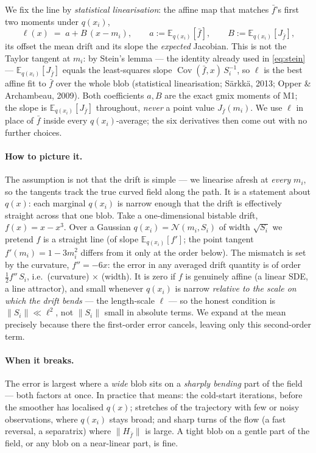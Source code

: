 \documentclass[11pt]{article}
\newcommand{\E}{\mathbb{E}}
\newcommand{\Eqx}{\E_{q(x_i)}}
\newcommand{\Cov}{\operatorname{Cov}}
\begin{document}
\noindent
We fix the line by \emph{statistical linearisation}: the affine map that
matches $\bar f$'s first two moments under $q(x_i)$,
\begin{equation}
\ell(x) \;=\; a + B\,(x-m_i),
\qquad
a := \Eqx[\bar f],
\qquad
B := \Eqx[J_{\bar f}],
\label{eq:linearise}
\end{equation}
its offset the mean drift and its slope the \emph{expected} Jacobian. This
is not the Taylor tangent at $m_i$: by Stein's lemma --- the identity
already used in \eqref{eq:stein} --- $\Eqx[J_{\bar f}]$ equals the
least-squares slope $\Cov(\bar f,x)\,S_i^{-1}$, so $\ell$ is the best
affine fit to $\bar f$ over the whole blob (statistical linearisation; S\"arkk\"a, 2013; Opper \& Archambeau, 2009). Both coefficients $a,B$ are
the exact gmix moments of M1; the slope is $\Eqx[J_{\bar f}]$
throughout, \emph{never} a point value $J_{\bar f}(m_i)$. We use $\ell$ in
place of $\bar f$ inside every $q(x_i)$-average; the six derivatives then
come out with no further choices.

\paragraph{How to picture it.}
The assumption is not that the drift is simple --- we linearise afresh at
\emph{every} $m_i$, so the tangents track the true curved field along the
path. It is a statement about $q(x)$: each marginal $q(x_i)$ is narrow
enough that the drift is effectively straight across that one blob. Take a
one-dimensional bistable drift, $f(x)=x-x^3$. Over a Gaussian $q(x_i)=\mathcal N(m_i,S_i)$ of width $\sqrt{S_i}$ we
pretend $f$ is a straight line (of slope $\Eqx[f']$; the point tangent
$f'(m_i)=1-3m_i^2$ differs from it only at the order below). The mismatch
is set by the curvature, $f''=-6x$: the error in any averaged drift
quantity is of order $\tfrac12 f''\,S_i$, i.e.\ (curvature) $\times$
(width).
It is zero if $f$ is genuinely affine (a linear SDE, a line attractor),
and small whenever $q(x_i)$ is narrow \emph{relative to the scale on which
the drift bends} --- the length-scale $\ell$ --- so the honest condition
is $\|S_i\|\ll\ell^2$, not $\|S_i\|$ small in absolute terms. We expand at
the mean precisely because there the first-order error cancels, leaving
only this second-order term.

\paragraph{When it breaks.}
The error is largest where a \emph{wide} blob sits on a \emph{sharply
bending} part of the field --- both factors at once. In practice that
means: the cold-start iterations, before the smoother has localised
$q(x)$; stretches of the trajectory with few or noisy observations, where
$q(x_i)$ stays broad; and sharp turns of the flow (a fast reversal, a
separatrix) where $\|H_{\bar f}\|$ is large. A tight blob on a gentle part
of the field, or any blob on a near-linear part, is fine.
\end{document}
